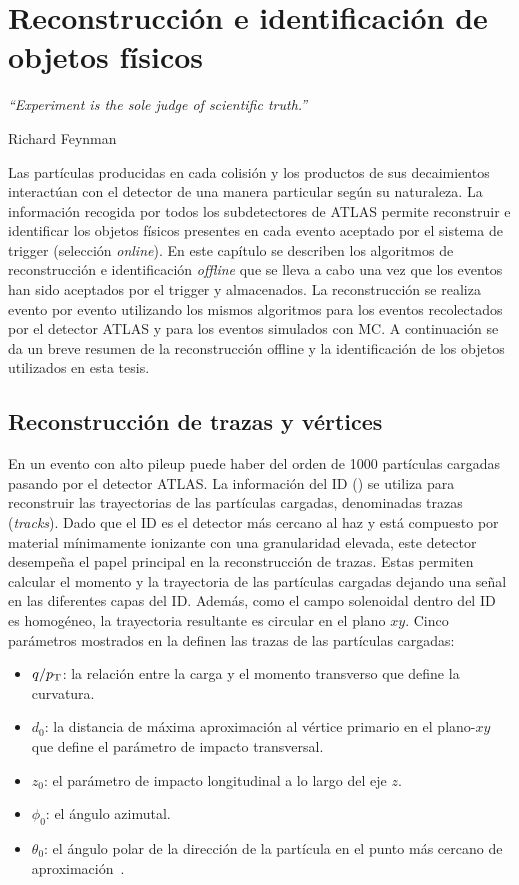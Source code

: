 \chapter{Reconstrucción e identificación de objetos físicos}
\label{ch:objects}
\epigraph{\emph{``Experiment is the sole judge of scientific truth.”}}{Richard Feynman}


Las partículas producidas en cada colisión y los productos de sus decaimientos interactúan con el detector de una manera particular según su naturaleza. La información recogida por todos los subdetectores de \ac{ATLAS} permite reconstruir e identificar los objetos físicos presentes en cada evento aceptado por el sistema de trigger (selección \textit{online}). En este capítulo se describen los algoritmos de reconstrucción e identificación \textit{offline} que se lleva a cabo una vez que los eventos han sido aceptados por el trigger y almacenados. La reconstrucción se realiza evento por evento utilizando los mismos algoritmos para los eventos recolectados por el detector \ac{ATLAS} y para los eventos simulados con \acf{MC}. A continuación se da un breve resumen de la reconstrucción offline y la identificación de los objetos utilizados en esta tesis.




\section{Reconstrucción de trazas y vértices}

En un evento con alto pileup puede haber del orden de 1000 partículas cargadas pasando por el detector \ac{ATLAS}. La información del \ac{ID} (\Sect{\ref{subsec:atlas:atlas:id}}) se utiliza para reconstruir las trayectorias de las partículas cargadas, denominadas trazas (\textit{tracks}).
Dado que el \ac{ID} es el detector más cercano al haz y está compuesto por material mínimamente ionizante con una granularidad elevada, este detector desempeña el papel principal en la reconstrucción de trazas. Estas permiten calcular el momento y la trayectoria de las partículas cargadas dejando una señal en las diferentes capas del \ac{ID}. Además, como el campo solenoidal dentro del \ac{ID} es homogéneo, la trayectoria resultante es circular en el plano \(xy\). Cinco parámetros mostrados en la \Fig{\ref{fig:objects:track_vtx:track_parameters}} definen las trazas de las partículas cargadas:
\begin{itemize}
    \item \(q/p_{\text{T}}\): la relación entre la carga y el momento transverso que define la curvatura.
    \item \(d_0\): la distancia de máxima aproximación al vértice primario en el plano-\(xy\) que define el parámetro de impacto transversal.
    \item \(z_0\): el parámetro de impacto longitudinal a lo largo del eje \(z\).
    \item \(\phi_0\): el ángulo azimutal.
    \item \(\theta_0\): el ángulo polar de la dirección de la partícula en el punto más cercano de aproximación~\cite{ATLAS-Tracks-Performance-Run2}.
\end{itemize}

